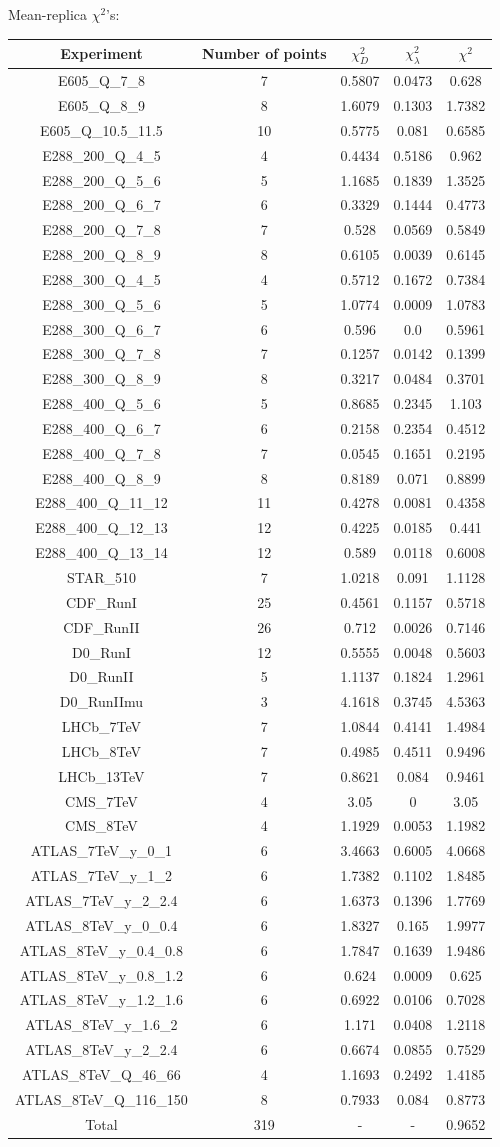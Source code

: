 \documentclass[
]{article}
\begin{document}
Mean-replica \(\chi^2\)'s:

\begin{longtable}[]{@{}ccccc@{}}
\toprule
Experiment & Number of points & \(\chi_{D}^2\) & \(\chi_{\lambda}^2\) &
\(\chi^2\)\tabularnewline
\midrule
\endhead
E605\_Q\_7\_8 & 7 & 0.5807 & 0.0473 & 0.628\tabularnewline
E605\_Q\_8\_9 & 8 & 1.6079 & 0.1303 & 1.7382\tabularnewline
E605\_Q\_10.5\_11.5 & 10 & 0.5775 & 0.081 & 0.6585\tabularnewline
E288\_200\_Q\_4\_5 & 4 & 0.4434 & 0.5186 & 0.962\tabularnewline
E288\_200\_Q\_5\_6 & 5 & 1.1685 & 0.1839 & 1.3525\tabularnewline
E288\_200\_Q\_6\_7 & 6 & 0.3329 & 0.1444 & 0.4773\tabularnewline
E288\_200\_Q\_7\_8 & 7 & 0.528 & 0.0569 & 0.5849\tabularnewline
E288\_200\_Q\_8\_9 & 8 & 0.6105 & 0.0039 & 0.6145\tabularnewline
E288\_300\_Q\_4\_5 & 4 & 0.5712 & 0.1672 & 0.7384\tabularnewline
E288\_300\_Q\_5\_6 & 5 & 1.0774 & 0.0009 & 1.0783\tabularnewline
E288\_300\_Q\_6\_7 & 6 & 0.596 & 0.0 & 0.5961\tabularnewline
E288\_300\_Q\_7\_8 & 7 & 0.1257 & 0.0142 & 0.1399\tabularnewline
E288\_300\_Q\_8\_9 & 8 & 0.3217 & 0.0484 & 0.3701\tabularnewline
E288\_400\_Q\_5\_6 & 5 & 0.8685 & 0.2345 & 1.103\tabularnewline
E288\_400\_Q\_6\_7 & 6 & 0.2158 & 0.2354 & 0.4512\tabularnewline
E288\_400\_Q\_7\_8 & 7 & 0.0545 & 0.1651 & 0.2195\tabularnewline
E288\_400\_Q\_8\_9 & 8 & 0.8189 & 0.071 & 0.8899\tabularnewline
E288\_400\_Q\_11\_12 & 11 & 0.4278 & 0.0081 & 0.4358\tabularnewline
E288\_400\_Q\_12\_13 & 12 & 0.4225 & 0.0185 & 0.441\tabularnewline
E288\_400\_Q\_13\_14 & 12 & 0.589 & 0.0118 & 0.6008\tabularnewline
STAR\_510 & 7 & 1.0218 & 0.091 & 1.1128\tabularnewline
CDF\_RunI & 25 & 0.4561 & 0.1157 & 0.5718\tabularnewline
CDF\_RunII & 26 & 0.712 & 0.0026 & 0.7146\tabularnewline
D0\_RunI & 12 & 0.5555 & 0.0048 & 0.5603\tabularnewline
D0\_RunII & 5 & 1.1137 & 0.1824 & 1.2961\tabularnewline
D0\_RunIImu & 3 & 4.1618 & 0.3745 & 4.5363\tabularnewline
LHCb\_7TeV & 7 & 1.0844 & 0.4141 & 1.4984\tabularnewline
LHCb\_8TeV & 7 & 0.4985 & 0.4511 & 0.9496\tabularnewline
LHCb\_13TeV & 7 & 0.8621 & 0.084 & 0.9461\tabularnewline
CMS\_7TeV & 4 & 3.05 & 0 & 3.05\tabularnewline
CMS\_8TeV & 4 & 1.1929 & 0.0053 & 1.1982\tabularnewline
ATLAS\_7TeV\_y\_0\_1 & 6 & 3.4663 & 0.6005 & 4.0668\tabularnewline
ATLAS\_7TeV\_y\_1\_2 & 6 & 1.7382 & 0.1102 & 1.8485\tabularnewline
ATLAS\_7TeV\_y\_2\_2.4 & 6 & 1.6373 & 0.1396 & 1.7769\tabularnewline
ATLAS\_8TeV\_y\_0\_0.4 & 6 & 1.8327 & 0.165 & 1.9977\tabularnewline
ATLAS\_8TeV\_y\_0.4\_0.8 & 6 & 1.7847 & 0.1639 & 1.9486\tabularnewline
ATLAS\_8TeV\_y\_0.8\_1.2 & 6 & 0.624 & 0.0009 & 0.625\tabularnewline
ATLAS\_8TeV\_y\_1.2\_1.6 & 6 & 0.6922 & 0.0106 & 0.7028\tabularnewline
ATLAS\_8TeV\_y\_1.6\_2 & 6 & 1.171 & 0.0408 & 1.2118\tabularnewline
ATLAS\_8TeV\_y\_2\_2.4 & 6 & 0.6674 & 0.0855 & 0.7529\tabularnewline
ATLAS\_8TeV\_Q\_46\_66 & 4 & 1.1693 & 0.2492 & 1.4185\tabularnewline
ATLAS\_8TeV\_Q\_116\_150 & 8 & 0.7933 & 0.084 & 0.8773\tabularnewline
Total & 319 & - & - & 0.9652\tabularnewline
\bottomrule
\end{longtable}
\end{document}
